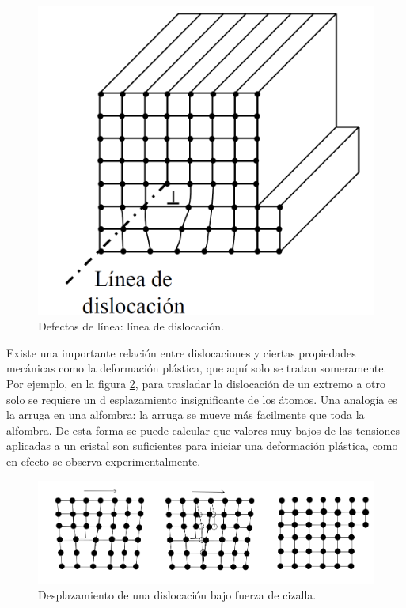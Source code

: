 \begin{figure}[h!] \centering
    \includegraphics[scale=0.5]{Cuerpo/Ch_01/linea_dislocacion.png}
    \caption{Defectos de línea: línea de dislocación.}
    \label{Fig:01-07}
\end{figure}

Existe una importante relación entre dislocaciones y ciertas propiedades mecánicas como la deformación plástica, que aquí solo se tratan someramente. Por ejemplo, en la figura \ref{Fig:01-08}, para trasladar la dislocación de un extremo a otro solo se requiere un d esplazamiento insignificante de los átomos. Una analogía es la arruga en una alfombra: la arruga se mueve más facilmente que toda la alfombra. De esta forma se puede calcular que valores muy bajos de las tensiones aplicadas a un cristal son suficientes para iniciar una deformación plástica, como en efecto se observa experimentalmente.

\begin{figure}[h!] \centering
    \includegraphics[scale=0.7]{Cuerpo/Ch_01/desplazamiento.png}
    \caption{Desplazamiento de una dislocación bajo fuerza de cizalla.}
    \label{Fig:01-08}
\end{figure}
